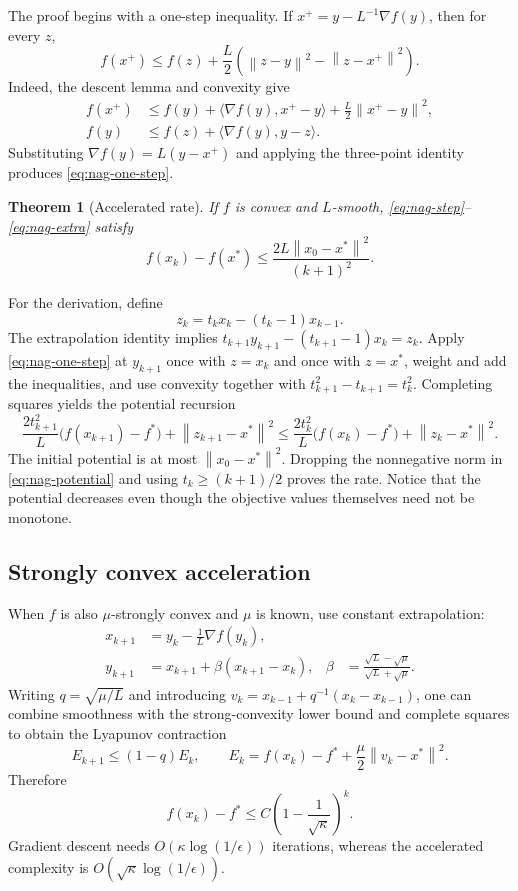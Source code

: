 \documentclass[12pt,oneside]{book}
\numberwithin{equation}{section}
\theoremstyle{definition}
\theoremstyle{plain}
\newtheorem{theorem}{Theorem}[section]
\theoremstyle{remark}
\newcommand{\norm}[1]{\left\lVert #1 \right\rVert}
\begin{document}
The proof begins with a one-step inequality. If
$x^+=y-L^{-1}\nabla f(y)$, then for every $z$,
\begin{equation}\label{eq:nag-one-step}
 f(x^+)\leq f(z)+\frac L2
 \left(\norm{z-y}^2-\norm{z-x^+}^2\right).
\end{equation}
Indeed, the descent lemma and convexity give
\begin{align*}
 f(x^+)&\leq f(y)+\langle\nabla f(y),x^+-y\rangle
              +\frac L2\norm{x^+-y}^2,\\
 f(y)&\leq f(z)+\langle\nabla f(y),y-z\rangle.
\end{align*}
Substituting $\nabla f(y)=L(y-x^+)$ and applying the three-point identity
produces \eqref{eq:nag-one-step}.

\begin{theorem}[Accelerated rate]
If $f$ is convex and $L$-smooth, \eqref{eq:nag-step}--\eqref{eq:nag-extra}
satisfy
\[
    f(x_k)-f(x^*)\leq\frac{2L\norm{x_0-x^*}^2}{(k+1)^2}.
\]
\end{theorem}

For the derivation, define
\[
 z_k=t_kx_k-(t_k-1)x_{k-1}.
\]
The extrapolation identity implies
$t_{k+1}y_{k+1}-(t_{k+1}-1)x_k=z_k$. Apply
\eqref{eq:nag-one-step} at $y_{k+1}$ once with $z=x_k$ and once with
$z=x^*$, weight and add the inequalities, and use convexity together with
$t_{k+1}^2-t_{k+1}=t_k^2$. Completing squares yields the potential recursion
\begin{equation}\label{eq:nag-potential}
 \frac{2t_{k+1}^2}{L}\bigl(f(x_{k+1})-f^*\bigr)
   +\norm{z_{k+1}-x^*}^2
 \leq
 \frac{2t_k^2}{L}\bigl(f(x_k)-f^*\bigr)
   +\norm{z_k-x^*}^2.
\end{equation}
The initial potential is at most $\norm{x_0-x^*}^2$. Dropping the
nonnegative norm in \eqref{eq:nag-potential} and using
$t_k\geq(k+1)/2$ proves the rate. Notice that the potential decreases even
though the objective values themselves need not be monotone.

\subsection{Strongly convex acceleration}

When $f$ is also $\mu$-strongly convex and $\mu$ is known, use constant
extrapolation:
\begin{align*}
 x_{k+1}&=y_k-\frac1L\nabla f(y_k),\\
 y_{k+1}&=x_{k+1}+\beta(x_{k+1}-x_k),
 &\beta&=\frac{\sqrt L-\sqrt\mu}{\sqrt L+\sqrt\mu}.
\end{align*}
Writing $q=\sqrt{\mu/L}$ and introducing
$v_k=x_{k-1}+q^{-1}(x_k-x_{k-1})$, one can combine smoothness with the
strong-convexity lower bound and complete squares to obtain the Lyapunov
contraction
\[
 E_{k+1}\leq(1-q)E_k,
 \qquad
 E_k=f(x_k)-f^*+\frac\mu2\norm{v_k-x^*}^2.
\]
Therefore
\[
 f(x_k)-f^*\leq C\left(1-\frac1{\sqrt\kappa}\right)^k.
\]
Gradient descent needs $O(\kappa\log(1/\epsilon))$ iterations, whereas the
accelerated complexity is $O(\sqrt\kappa\log(1/\epsilon))$.
\end{document}
